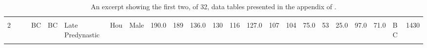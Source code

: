 \begin{table}[p]
{\begin{tabular}{rrrlllllrrrrrrrrrrrrrlr}
\cellcolor{gray!10}{2} & \cellcolor{gray!10}{} & \cellcolor{gray!10}{} & \cellcolor{gray!10}{BC} & \cellcolor{gray!10}{BC} & \cellcolor{gray!10}{Late Predynastic} & \cellcolor{gray!10}{Hou} & \cellcolor{gray!10}{Male} & \cellcolor{gray!10}{194.0} & \cellcolor{gray!10}{194} & \cellcolor{gray!10}{134.0} & \cellcolor{gray!10}{138} & \cellcolor{gray!10}{109} & \cellcolor{gray!10}{116.0} & \cellcolor{gray!10}{100} & \cellcolor{gray!10}{98} & \cellcolor{gray!10}{68.0} & \cellcolor{gray!10}{49} & \cellcolor{gray!10}{24.0} & \cellcolor{gray!10}{98.0} & \cellcolor{gray!10}{71.0} & \cellcolor{gray!10}{C} & \cellcolor{gray!10}{1525}\\
2 &  &  & BC & BC & Late Predynastic & Hou & Male & 190.0 & 189 & 136.0 & 130 & 116 & 127.0 & 107 & 104 & 75.0 & 53 & 25.0 & 97.0 & 71.0 & B C & 1430\\
\cellcolor{gray!10}{2} & \cellcolor{gray!10}{} & \cellcolor{gray!10}{} & \cellcolor{gray!10}{BC} & \cellcolor{gray!10}{BC} & \cellcolor{gray!10}{Late Predynastic} & \cellcolor{gray!10}{Hou} & \cellcolor{gray!10}{Male} & \cellcolor{gray!10}{182.0} & \cellcolor{gray!10}{180} & \cellcolor{gray!10}{128.0} & \cellcolor{gray!10}{131} & \cellcolor{gray!10}{111} & \cellcolor{gray!10}{126.0} & \cellcolor{gray!10}{99} & \cellcolor{gray!10}{98} & \cellcolor{gray!10}{63.0} & \cellcolor{gray!10}{45} & \cellcolor{gray!10}{25.0} & \cellcolor{gray!10}{99.0} & \cellcolor{gray!10}{71.0} & \cellcolor{gray!10}{D} & \cellcolor{gray!10}{1300}\\
\bottomrule
\end{tabular}}
\caption{An excerpt showing the first two, of 32, data tables presented in the appendix of \textcite{Thomson1905}.}
\label{tab:skulls_full}
\end{table}
